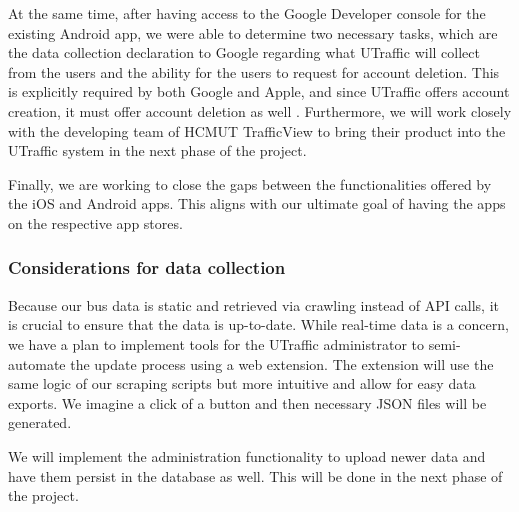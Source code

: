 At the same time, after having access to the Google Developer console for the existing Android app, we were able to determine two necessary tasks, which are the data collection declaration to Google regarding what UTraffic will collect from the users and the ability for the users to request for account deletion. This is explicitly required by both Google and Apple, and since UTraffic offers account creation, it must offer account deletion as well \cite{apple_account_deletion} \cite{google_account_deletion}. Furthermore, we will work closely with the developing team of HCMUT TrafficView to bring their product into the UTraffic system in the next phase of the project.

Finally, we are working to close the gaps between the functionalities offered by the iOS and Android apps. This aligns with our ultimate goal of having the apps on the respective app stores. 

\subsubsection{Considerations for data collection}
Because our bus data is static and retrieved via crawling instead of API calls, it is crucial to ensure that the data is up-to-date. While real-time data is a concern, we have a plan to implement tools for the UTraffic administrator to semi-automate the update process using a web extension. The extension will use the same logic of our scraping scripts but more intuitive and allow for easy data exports. We imagine a click of a button and then necessary JSON files will be generated. 

We will implement the administration functionality to upload newer data and have them persist in the database as well. This will be done in the next phase of the project.